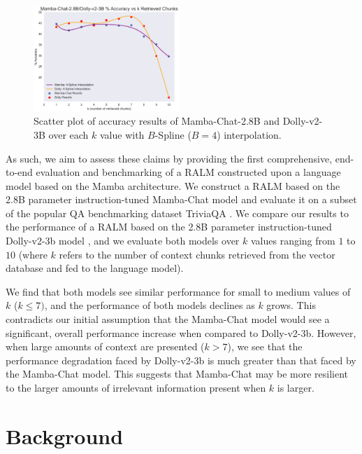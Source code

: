 \documentclass[11pt]{article}
\begin{document}
\begin{figure}[t]
    \centering
    \includegraphics[width=0.49\textwidth]{rag-results-over-k.png}
    \caption{Scatter plot of accuracy results of Mamba-Chat-2.8B and Dolly-v2-3B over each $k$ value with $B$-Spline ($B=4$) interpolation.}
    \label{fig:mamba-chat-results}
\end{figure}

As such, we aim to assess these claims by providing the first comprehensive, end-to-end evaluation and benchmarking of a RALM constructed upon a language model based on the Mamba architecture. We construct a RALM based on the 2.8B parameter instruction-tuned Mamba-Chat model \cite{haven2023mambachat} and evaluate it on a subset of the popular QA benchmarking dataset TriviaQA \cite{Joshi2017TriviaQAAL}. We compare our results to the performance of a RALM based on the 2.8B parameter instruction-tuned Dolly-v2-3b model \cite{DatabricksBlog2023DollyV2}, and we evaluate both models over $k$ values ranging from $1$ to $10$ (where $k$ refers to the number of context chunks retrieved from the vector database and fed to the language model).

We find that both models see similar performance for small to medium values of $k$ ($k \leq 7)$, and the performance of both models declines as $k$ grows. This contradicts our initial assumption that the Mamba-Chat model would see a significant, overall performance increase when compared to Dolly-v2-3b. However, when large amounts of context are presented ($k > 7$), we see that the performance degradation faced by Dolly-v2-3b is much greater than that faced by the Mamba-Chat model. This suggests that Mamba-Chat may be more resilient to the larger amounts of irrelevant information present when $k$ is larger.
 
\section{Background}
\end{document}
